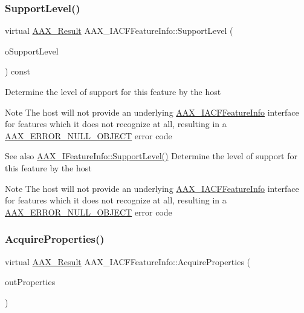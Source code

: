 \subsubsection{\texorpdfstring{SupportLevel()}{SupportLevel()}}
{\footnotesize\ttfamily virtual \mbox{\hyperlink{a00392_a4d8f69a697df7f70c3a8e9b8ee130d2f}{A\+A\+X\+\_\+\+Result}} A\+A\+X\+\_\+\+I\+A\+C\+F\+Feature\+Info\+::\+Support\+Level (\begin{DoxyParamCaption}\item[{\mbox{\hyperlink{a00491_aca7bf42860665d5da66f4ac342e761b3}{A\+A\+X\+\_\+\+E\+Support\+Level}} $\ast$}]{o\+Support\+Level }\end{DoxyParamCaption}) const\hspace{0.3cm}{\ttfamily [pure virtual]}}





Determine the level of support for this feature by the host

\begin{DoxyNote}{Note}
The host will not provide an underlying \mbox{\hyperlink{a01689}{A\+A\+X\+\_\+\+I\+A\+C\+F\+Feature\+Info}} interface for features which it does not recognize at all, resulting in a \mbox{\hyperlink{a00494_a5f8c7439f3a706c4f8315a9609811937a647cce13fa531e3a46c6eab694048a9c}{A\+A\+X\+\_\+\+E\+R\+R\+O\+R\+\_\+\+N\+U\+L\+L\+\_\+\+O\+B\+J\+E\+CT}} error code
\end{DoxyNote}
\begin{DoxySeeAlso}{See also}
\mbox{\hyperlink{a01829_a5f105b85ef855eb8c3da0ff06325b018}{A\+A\+X\+\_\+\+I\+Feature\+Info\+::\+Support\+Level()}} Determine the level of support for this feature by the host
\end{DoxySeeAlso}
\begin{DoxyNote}{Note}
The host will not provide an underlying \mbox{\hyperlink{a01689}{A\+A\+X\+\_\+\+I\+A\+C\+F\+Feature\+Info}} interface for features which it does not recognize at all, resulting in a \mbox{\hyperlink{a00494_a5f8c7439f3a706c4f8315a9609811937a647cce13fa531e3a46c6eab694048a9c}{A\+A\+X\+\_\+\+E\+R\+R\+O\+R\+\_\+\+N\+U\+L\+L\+\_\+\+O\+B\+J\+E\+CT}} error code 
\end{DoxyNote}
\mbox{\label{a01689_a6ea3222257cdc9395ad5a766d4130df8}} 
\subsubsection{\texorpdfstring{AcquireProperties()}{AcquireProperties()}}
{\footnotesize\ttfamily virtual \mbox{\hyperlink{a00392_a4d8f69a697df7f70c3a8e9b8ee130d2f}{A\+A\+X\+\_\+\+Result}} A\+A\+X\+\_\+\+I\+A\+C\+F\+Feature\+Info\+::\+Acquire\+Properties (\begin{DoxyParamCaption}\item[{\mbox{\hyperlink{a01409}{I\+A\+C\+F\+Unknown}} $\ast$$\ast$}]{out\+Properties }\end{DoxyParamCaption})\hspace{0.3cm}{\ttfamily [pure virtual]}}

